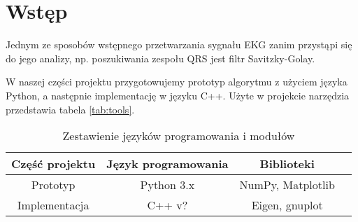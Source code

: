\section{Wstęp}

Jednym ze sposobów wstępnego przetwarzania sygnału EKG zanim przystąpi się do jego analizy, np. poszukiwania zespołu QRS jest filtr Savitzky-Golay.

W naszej części projektu przygotowujemy prototyp algorytmu z użyciem języka Python, a następnie implementację w języku C++. Użyte w projekcie narzędzia przedstawia tabela \ref{tab:tools}.

\begin{table}[!htb]
  \centering
  \begin{tabular}{|c|c|c|c|}
  \hline
  Część projektu & Język programowania & Biblioteki \\
  \hline
  Prototyp & Python 3.x & NumPy, Matplotlib \\
  \hline
  Implementacja & C++ v? & Eigen, gnuplot \\
  \hline
  \end{tabular}
  \caption{Zestawienie języków programowania i modułów}
  \label{tab:tabela1}
\end{table}
